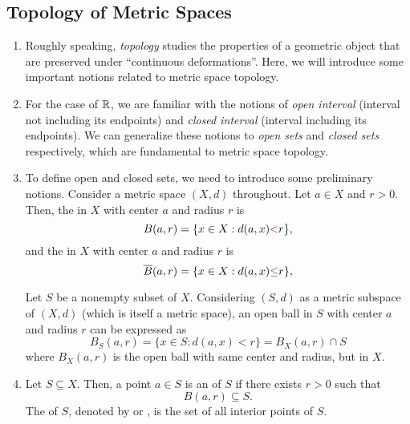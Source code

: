 \subsection{Topology of Metric Spaces}
\label{subsect:metric-spaces-topo}
\begin{enumerate}
\item Roughly speaking, \emph{topology} studies the properties of a geometric
object that are preserved under ``continuous deformations''. Here, we will
introduce some important notions related to metric space topology.

\item For the case of \(\mathbb{R}\), we are familiar with the notions of \emph{open
interval} (interval not including its endpoints) and \emph{closed interval}
(interval including its endpoints). We can generalize these notions to
\emph{open sets} and \emph{closed sets} respectively, which are fundamental to
metric space topology.

\item To define open and closed sets, we need to introduce some preliminary
notions. Consider a metric space \((X,d)\) throughout. Let \(a\in X\) and
\(r>0\). Then, the  in \(X\) with center \(a\) and radius \(r\)
is
\[
B(a,r)=\{x\in X: d(a,x){\color{violet}<}r\},
\]
and the  in \(X\) with center \(a\) and radius \(r\) is
\[
\overline{B}(a,r)=\{x\in X: d(a,x){\color{violet}\le}r\},
\]
\begin{center}
\end{center}
\begin{note}
Let \(S\) be a nonempty subset of \(X\).  Considering \((S,d)\) as a metric
subspace of \((X,d)\) (which is itself a metric space), an open ball in \(S\)
with center \(a\) and radius \(r\) can be expressed as
\[
B_{S}(a,r)=\{x\in S:d(a,x)<r\}=B_{X}(a,r)\cap S
\]
where \(B_X(a,r)\) is the open ball with same center and radius, but in \(X\).
\end{note}
\item Let \(S\subseteq X\). Then, a point \(a\in S\) is an  of \(S\) if there exists \(r>0\) such that \[
B(a,r)\subseteq S.
\]
The  of \(S\), denoted by  or
, is the set of all interior points of \(S\).


\end{enumerate}
